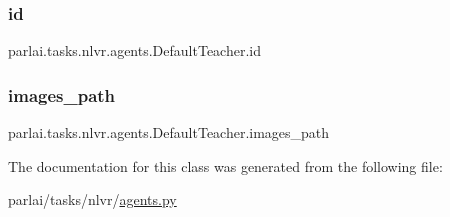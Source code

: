 \subsubsection{\texorpdfstring{id}{id}}
{\footnotesize\ttfamily parlai.\+tasks.\+nlvr.\+agents.\+Default\+Teacher.\+id}

\mbox{\label{classparlai_1_1tasks_1_1nlvr_1_1agents_1_1DefaultTeacher_a2f3e63f887c9884ac7d12aee734c9a19}} 
\subsubsection{\texorpdfstring{images\+\_\+path}{images\_path}}
{\footnotesize\ttfamily parlai.\+tasks.\+nlvr.\+agents.\+Default\+Teacher.\+images\+\_\+path}



The documentation for this class was generated from the following file\+:\begin{DoxyCompactItemize}
\item 
parlai/tasks/nlvr/\hyperlink{parlai_2tasks_2nlvr_2agents_8py}{agents.\+py}\end{DoxyCompactItemize}
